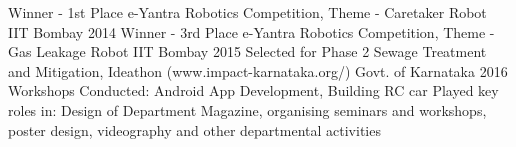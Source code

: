 \begin{cvhonors}
  \cvhonor
    {Winner - 1st Place}
    {e-Yantra Robotics Competition, Theme - Caretaker Robot}
    {IIT Bombay}
    {2014}
  \cvhonor
    {Winner - 3rd Place}
    {e-Yantra Robotics Competition, Theme - Gas Leakage Robot}
    {IIT Bombay}
    {2015}
  \cvhonor
    {Selected for Phase 2}
    {Sewage Treatment and Mitigation, Ideathon (www.impact-karnataka.org/)}
    {Govt. of Karnataka}
    {2016}
    \cvhonor
    {Workshops Conducted:}
    {Android App Development, Building RC car}
    {}
    {}
    \cvhonor
    {Played key roles in:}
    {Design of Department Magazine, organising seminars and workshops, poster design, videography and other departmental activities}
    {}
    {}
\end{cvhonors}
